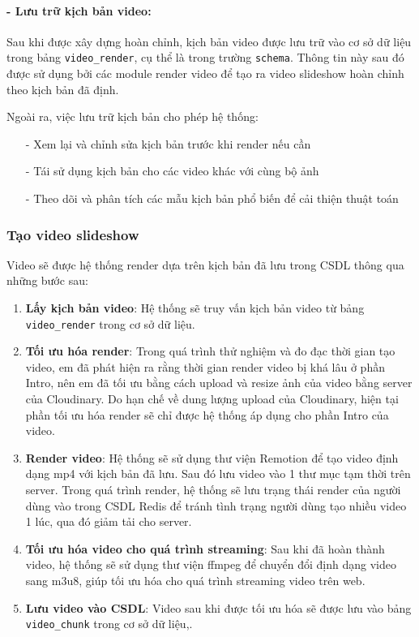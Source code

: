 \paragraph{- Lưu trữ kịch bản video:}
Sau khi được xây dựng hoàn chỉnh, kịch bản video được lưu trữ vào cơ sở dữ liệu trong bảng \texttt{video\_render}, cụ thể là trong trường \texttt{schema}. Thông tin này sau đó được sử dụng bởi các module render video để tạo ra video slideshow hoàn chỉnh theo kịch bản đã định.

Ngoài ra, việc lưu trữ kịch bản cho phép hệ thống:
\begin{itemize}
    \item[-] Xem lại và chỉnh sửa kịch bản trước khi render nếu cần
    \item[-] Tái sử dụng kịch bản cho các video khác với cùng bộ ảnh
    \item[-] Theo dõi và phân tích các mẫu kịch bản phổ biến để cải thiện thuật toán
\end{itemize}

\subsubsection{Tạo video slideshow}
Video sẽ được hệ thống render dựa trên kịch bản đã lưu trong CSDL thông qua những bước sau:

\begin{enumerate}
    \item \textbf{Lấy kịch bản video}: Hệ thống sẽ truy vấn kịch bản video từ bảng \texttt{video\_render} trong cơ sở dữ liệu.
    \item \textbf{Tối ưu hóa render}: Trong quá trình thử nghiệm và đo đạc thời gian tạo video, em đã phát hiện ra rằng thời gian render video bị khá lâu ở phần Intro, nên em đã tối ưu bằng cách upload và resize ảnh của video bằng server của Cloudinary. Do hạn chế về dung lượng upload của Cloudinary, hiện tại phần tối ưu hóa render sẽ chỉ được hệ thống áp dụng cho phần Intro của video.
    \item \textbf{Render video}: Hệ thống sẽ sử dụng thư viện Remotion để tạo video định dạng mp4 với kịch bản đã lưu. Sau đó lưu video vào 1 thư mục tạm thời trên server. Trong quá trình render, hệ thống sẽ lưu trạng thái render của người dùng vào trong CSDL Redis để tránh tình trạng người dùng tạo nhiều video 1 lúc, qua đó giảm tải cho server.
    \item \textbf{Tối ưu hóa video cho quá trình streaming}: Sau khi đã hoàn thành video, hệ thống sẽ sử dụng thư viện ffmpeg để chuyển đổi định dạng video sang m3u8, giúp tối ưu hóa cho quá trình streaming video trên web. 
    \item \textbf{Lưu video vào CSDL}: Video sau khi được tối ưu hóa sẽ được lưu vào bảng \texttt{video\_chunk} trong cơ sở dữ liệu,.
\end{enumerate}

